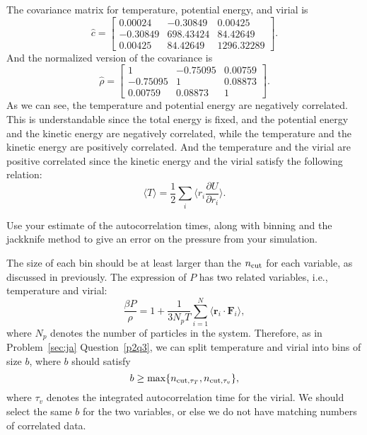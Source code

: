 \Answer{}
The covariance matrix for temperature, potential energy, and virial is
%
\begin{equation}
    \hat{c} =
    \begin{bmatrix}
        0.00024  & -0.30849  & 0.00425    \\
        -0.30849 & 698.43424 & 84.42649   \\
        0.00425  & 84.42649  & 1296.32289
    \end{bmatrix}.
\end{equation}
%
And the normalized version of the covariance is
%
\begin{equation}
    \hat{\rho} =
    \begin{bmatrix}
        1        & -0.75095 & 0.00759 \\
        -0.75095 & 1        & 0.08873 \\
        0.00759  & 0.08873  & 1
    \end{bmatrix}.
\end{equation}
%
As we can see, the temperature and potential energy are negatively correlated.
This is understandable since the total energy is fixed, and the potential energy and
the kinetic energy are negatively correlated, while the temperature and the kinetic
energy are positively correlated.
And the temperature and the virial are positive correlated since the kinetic energy
and the virial satisfy the following relation:
%
\begin{equation}
    \langle T \rangle = \frac{ 1 }{ 2 }
    \sum_i
    \biggl\langle r_i \frac{ \partial U }{ \partial r_i } \biggr\rangle.
\end{equation}


\Question{} Use your estimate of the autocorrelation times, along with binning and the
jackknife method to give an error on the pressure from your simulation.

\Answer{}
The size of each bin should be at least larger than the \(n_\textnormal{cut}\)
for each variable, as discussed in previously.
The expression of \(P\) has two related variables, i.e., temperature and virial:
%
\begin{equation}
    \frac{ \beta P }{ \rho } = 1 + \frac{ 1 }{ 3N_p T } \sum_{i=1}^{N}
    \langle \bm{r}_i \cdot \bm{F}_i \rangle,
\end{equation}
%
where \(N_p\) denotes the number of particles in the system.
Therefore, as in Problem~\ref{sec:ja} Question~\ref{p2q3}, we can split temperature
and virial into bins of size \(b\), where \(b\) should satisfy
%
\begin{equation}
    b \geq \max \{n_{\textnormal{cut}, \tau_T}, n_{\textnormal{cut}, \tau_v}\},
\end{equation}
%
where \(\tau_v\) denotes the integrated autocorrelation time for the virial.
We should select the same \(b\) for the two variables,
or else we do not have matching numbers of correlated data.

